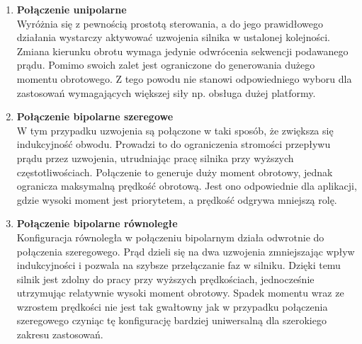 \begin{enumerate}
    \item \textbf{Połączenie unipolarne}\\
    Wyróżnia się z pewnością prostotą sterowania, a do jego prawidłowego działania wystarczy aktywować uzwojenia silnika w ustalonej kolejności. Zmiana kierunku obrotu wymaga jedynie odwrócenia sekwencji podawanego prądu. Pomimo swoich zalet jest ograniczone do generowania dużego momentu obrotowego. Z tego powodu nie stanowi odpowiedniego wyboru dla zastosowań wymagających większej siły np. obsługa dużej platformy.
    \item \textbf{Połączenie bipolarne szeregowe}\\
    W tym przypadku uzwojenia są połączone w taki sposób, że zwiększa się indukcyjność obwodu. Prowadzi to do ograniczenia stromości przepływu prądu przez uzwojenia, utrudniając pracę silnika przy wyższych częstotliwościach. Połączenie to generuje duży moment obrotowy, jednak ogranicza maksymalną prędkość obrotową. Jest ono odpowiednie dla aplikacji, gdzie wysoki moment jest priorytetem, a prędkość odgrywa mniejszą rolę.
    \vspace{1cm}
    \item \textbf{Połączenie bipolarne równoległe}\\
    Konfiguracja równoległa w połączeniu bipolarnym działa odwrotnie do połączenia szeregowego. Prąd dzieli się na dwa uzwojenia zmniejszając wpływ indukcyjności i pozwala na szybsze przełączanie faz w silniku. Dzięki temu silnik jest zdolny do pracy przy wyższych prędkościach, jednocześnie utrzymując relatywnie wysoki moment obrotowy. Spadek momentu wraz ze wzrostem prędkości nie jest tak gwałtowny jak w przypadku połączenia szeregowego czyniąc tę konfigurację bardziej uniwersalną dla szerokiego zakresu zastosowań.
\end{enumerate}

\vspace{1cm}

